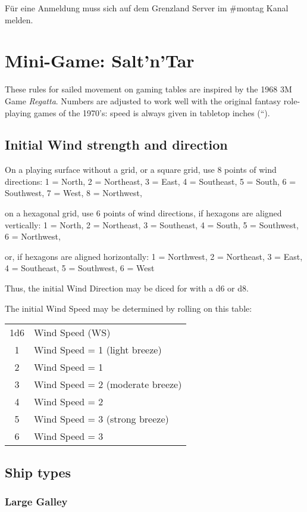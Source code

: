 \documentclass[11pt]{wbzine}
\begin{document}
\begin{multicols}{2}
Für eine Anmeldung muss sich auf dem Grenzland Server im \#montag
Kanal melden. 

\section{Mini-Game: Salt'n'Tar}

These rules for sailed movement on gaming tables are inspired by the
1968 3M Game \emph{Regatta}. Numbers are adjusted to work well with the
original fantasy role-playing games of the 1970's: speed is always given
in tabletop inches (``).

\subsection{Initial Wind strength and
direction}

On a playing surface without a grid, or a square grid, use 8 points of
wind directions: 1 = North, 2 = Northeast, 3 = East, 4 = Southeast, 5 =
South, 6 = Southwest, 7 = West, 8 = Northwest,

on a hexagonal grid, use 6 points of wind directions, if hexagons are
aligned vertically: 1 = North, 2 = Northeast, 3 = Southeast, 4 = South,
5 = Southwest, 6 = Northwest,

or, if hexagons are aligned horizontally: 1 = Northwest, 2 = Northeast,
3 = East, 4 = Southeast, 5 = Southwest, 6 = West

Thus, the initial Wind Direction may be diced for with a d6 or d8.

The initial Wind Speed may be determined by rolling on this table:

\begin{tabularx}{\columnwidth}{cZ}
1d6 & Wind Speed (WS) \\
1 & Wind Speed = 1 (light breeze) \\
2 & Wind Speed = 1 \\
3 & Wind Speed = 2 (moderate breeze) \\
4 & Wind Speed = 2 \\
5 & Wind Speed = 3 (strong breeze) \\
6 & Wind Speed = 3 \\
\end{tabularx}

\subsection{Ship types}

\subsubsection{Large Galley}


\end{multicols}
\end{document}
